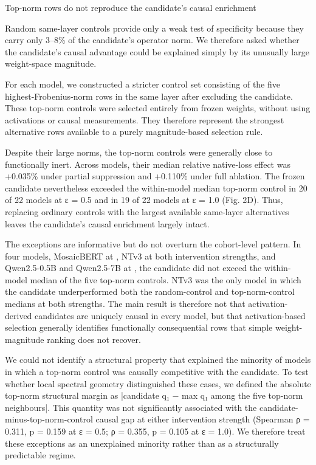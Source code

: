 \documentclass[11pt]{article}
\begin{document}
Top-norm rows do not reproduce the candidate’s causal enrichment

Random same-layer controls provide only a weak test of specificity because they carry only 3–8\% of the candidate’s operator norm. We therefore asked whether the candidate’s causal advantage could be explained simply by its unusually large weight-space magnitude.

For each model, we constructed a stricter control set consisting of the five highest-Frobenius-norm rows in the same layer after excluding the candidate. These top-norm controls were selected entirely from frozen weights, without using activations or causal measurements. They therefore represent the strongest alternative rows available to a purely magnitude-based selection rule.

Despite their large norms, the top-norm controls were generally close to functionally inert. Across models, their median relative native-loss effect was +0.035\% under partial suppression and +0.110\% under full ablation. The frozen candidate nevertheless exceeded the within-model median top-norm control in 20 of 22 models at ε = 0.5 and in 19 of 22 models at ε = 1.0 (Fig. 2D). Thus, replacing ordinary controls with the largest available same-layer alternatives leaves the candidate’s causal enrichment largely intact.

The exceptions are informative but do not overturn the cohort-level pattern. In four models, MosaicBERT at , NTv3 at both intervention strengths, and Qwen2.5-0.5B and Qwen2.5-7B at , the candidate did not exceed the within-model median of the five top-norm controls. NTv3 was the only model in which the candidate underperformed both the random-control and top-norm-control medians at both strengths.  The main result is therefore not that activation-derived candidates are uniquely causal in every model, but that activation-based selection generally identifies functionally consequential rows that simple weight-magnitude ranking does not recover.

We could not identify a structural property that explained the minority of models in which a top-norm control was causally competitive with the candidate. To test whether local spectral geometry distinguished these cases, we defined the absolute top-norm structural margin as |candidate q₁ − max q₁ among the five top-norm neighbours|. This quantity was not significantly associated with the candidate-minus-top-norm-control causal gap at either intervention strength (Spearman ρ = 0.311, p = 0.159 at ε = 0.5; ρ = 0.355, p = 0.105 at ε = 1.0). We therefore treat these exceptions as an unexplained minority rather than as a structurally predictable regime.
\end{document}
